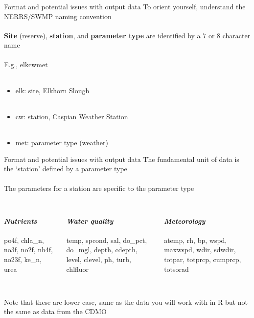 \documentclass[xcolor=svgnames]{beamer}\usepackage[]{graphicx}\usepackage[]{color}
\begin{document}
\begin{frame}{Format and potential issues with output data}
\onslide<+->
To orient yourself, understand the NERRS/SWMP naming convention\\~\\
\textbf{Site} (reserve), \textbf{station}, and \textbf{parameter type} are identified by a 7 or 8 character name \\~\\
\onslide<+->
E.g., elkcwmet \\~\\
\onslide<+->
\begin{itemize}
\item elk: site, Elkhorn Slough \\~\\
\item cw: station, Caspian Weather Station \\~\\
\item met: parameter type (weather)
\end{itemize}
\end{frame}

\begin{frame}{Format and potential issues with output data}
\onslide<+->
The fundamental unit of data is the `station' defined by a parameter type \\~\\
The parameters for a station are specific to the parameter type \\~\\
\begin{columns}[t]
\begin{column}{0.3\textwidth}
\textbf{\emph{Nutrients}} \\~\\
po4f, chla\_n, no3f, no2f, nh4f, no23f, ke\_n, urea
\end{column}
\begin{column}{0.3\textwidth}
\textbf{\emph{Water quality}} \\~\\
temp, spcond, sal, do\_pct, do\_mgl, depth, cdepth, level, clevel, ph, turb, chlfluor
\end{column}
\begin{column}{0.3\textwidth}
\textbf{\emph{Meteorology}} \\~\\
atemp, rh, bp, wspd, maxwspd, wdir, sdwdir, totpar, totprcp, cumprcp, totsorad \\~\\
\end{column}
\end{columns}
\onslide<+->
Note that these are lower case, same as the data you will work with in R but not the same as data from the CDMO
\end{frame}
\end{document}
